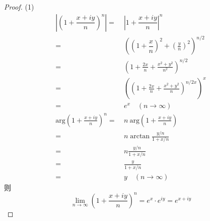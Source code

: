 \documentclass[12pt, a4paper, oneside]{ctexart}
\begin{document}
\begin{proof}(1)
    \begin{equation*}
        \begin{aligned}
            \left|\left(1+\dfrac{x+iy}{n}\right)^n\right| =&\ \left|1+\dfrac{x+iy}{n}\right|^n\\
            =&\ \left((1+\dfrac{x}{n})^2+(\frac{y}{n})^2\right)^{n/2}\\
            =&\ \left(1+\frac{2x}{n}+\frac{x^2+y^2}{n^2}\right)^{n/2}\\
            =&\ \left(\left(1+\frac{2x}{n}+\frac{x^2+y^2}{n}\right)^{n/2x}\right)^x\\
            =&\ e^x\quad (n\rightarrow \infty)\\
            \text{arg} \left(1+\frac{x+iy}{n}\right)^n = &\ n\ \text{arg}\left(1+\frac{x+iy}{n}\right)\\
            =&\ n\arctan\frac{y/n}{1+x/n}\\
            =&\ n\frac{y/n}{1+x/n}\\
            =&\ \frac{y}{1+x/n}\\
            =&\ y\quad (n\rightarrow\infty)
        \end{aligned}
    \end{equation*}
    则\begin{equation*}
        \lim\limits_{n\rightarrow\infty} \left(1+\frac{x+iy}{n}\right)^n = e^x\cdot e^{iy} = e^{x+iy}
    \end{equation*}
    

\end{proof}
\end{document}
